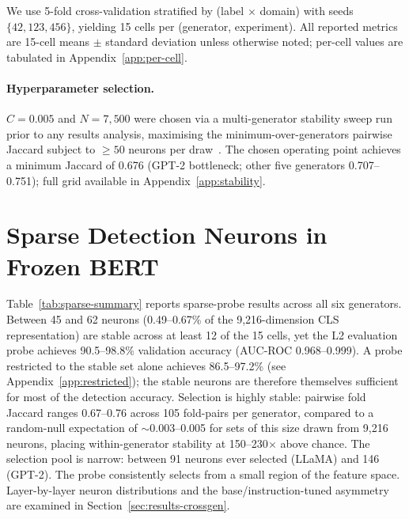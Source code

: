 \documentclass[11pt]{article}
\begin{document}
We use 5-fold cross-validation stratified by (label $\times$ domain) with seeds $\{42, 123, 456\}$, yielding 15 cells per (generator, experiment). All reported metrics are 15-cell means $\pm$ standard deviation unless otherwise noted; per-cell values are tabulated in Appendix~\ref{app:per-cell}.

\paragraph{Hyperparameter selection.}
\label{sec:setup-stability}%
$C = 0.005$ and $N = 7{,}500$ were chosen via a multi-generator stability sweep run prior to any results analysis, maximising the minimum-over-generators pairwise Jaccard subject to $\geq 50$ neurons per draw~\citep{gurnee2023haystack}. The chosen operating point achieves a minimum Jaccard of 0.676 (GPT-2 bottleneck; other five generators 0.707--0.751); full grid available in Appendix~\ref{app:stability}.

\section{Sparse Detection Neurons in Frozen BERT}
\label{sec:results-sparse}

Table~\ref{tab:sparse-summary} reports sparse-probe results across all six generators. Between 45 and 62 neurons (0.49--0.67\% of the 9{,}216-dimension CLS representation) are stable across at least 12 of the 15 cells, yet the L2 evaluation probe achieves 90.5--98.8\% validation accuracy (AUC-ROC 0.968--0.999). A probe restricted to the stable set alone achieves 86.5--97.2\% (see Appendix~\ref{app:restricted}); the stable neurons are therefore themselves sufficient for most of the detection accuracy. Selection is highly stable: pairwise fold Jaccard ranges 0.67--0.76 across 105 fold-pairs per generator, compared to a random-null expectation of $\sim$0.003--0.005 for sets of this size drawn from 9{,}216 neurons, placing within-generator stability at 150--230$\times$ above chance. The selection pool is narrow: between 91 neurons ever selected (LLaMA) and 146 (GPT-2). The probe consistently selects from a small region of the feature space. Layer-by-layer neuron distributions and the base/instruction-tuned asymmetry are examined in Section~\ref{sec:results-crossgen}.
\end{document}
